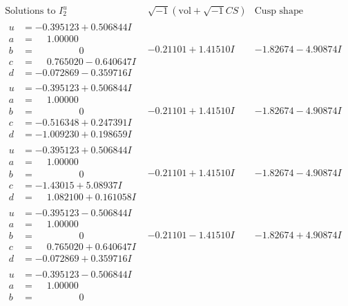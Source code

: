 \documentclass[1p]{elsarticle_modified}
\theoremstyle{definition}
\newcommand{\I}{\sqrt{-1}}
\begin{document}
$$\begin{array}{c|c|c}  
\text{Solutions to }I^u_{2}& \I (\text{vol} + \sqrt{-1}CS) & \text{Cusp shape}\\
 \hline 
\begin{aligned}
u &= -0.395123 + 0.506844 I \\
a &= \phantom{-}1.00000\phantom{ +0.000000I} \\
b &= \phantom{-0.000000 } 0 \\
c &= \phantom{-}0.765020 - 0.640647 I \\
d &= -0.072869 - 0.359716 I\end{aligned}
 & -0.21101 + 1.41510 I & -1.82674 - 4.90874 I \\ \hline\begin{aligned}
u &= -0.395123 + 0.506844 I \\
a &= \phantom{-}1.00000\phantom{ +0.000000I} \\
b &= \phantom{-0.000000 } 0 \\
c &= -0.516348 + 0.247391 I \\
d &= -1.009230 + 0.198659 I\end{aligned}
 & -0.21101 + 1.41510 I & -1.82674 - 4.90874 I \\ \hline\begin{aligned}
u &= -0.395123 + 0.506844 I \\
a &= \phantom{-}1.00000\phantom{ +0.000000I} \\
b &= \phantom{-0.000000 } 0 \\
c &= -1.43015 + 5.08937 I \\
d &= \phantom{-}1.082100 + 0.161058 I\end{aligned}
 & -0.21101 + 1.41510 I & -1.82674 - 4.90874 I \\ \hline\begin{aligned}
u &= -0.395123 - 0.506844 I \\
a &= \phantom{-}1.00000\phantom{ +0.000000I} \\
b &= \phantom{-0.000000 } 0 \\
c &= \phantom{-}0.765020 + 0.640647 I \\
d &= -0.072869 + 0.359716 I\end{aligned}
 & -0.21101 - 1.41510 I & -1.82674 + 4.90874 I \\ \hline\begin{aligned}
u &= -0.395123 - 0.506844 I \\
a &= \phantom{-}1.00000\phantom{ +0.000000I} \\
b &= \phantom{-0.000000 } 0 \\

\end{aligned}
\end{array}$$
\end{document}
